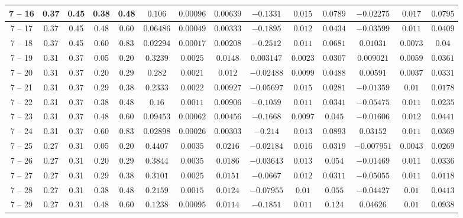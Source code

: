\begin{longtable}{|*{14}{c|}}
\hline
7 -- 16 & 0.37 & 0.45 & 0.38 & 0.48 & $0.106$ & $0.00096$ & $0.00639$ & $-0.1331$ & $0.015$ & $0.0789$ & $-0.02275$ & $0.017$ & $0.0795$ \\
\hline
7 -- 17 & 0.37 & 0.45 & 0.48 & 0.60 & $0.06486$ & $0.00049$ & $0.00333$ & $-0.1895$ & $0.012$ & $0.0434$ & $-0.03599$ & $0.011$ & $0.0409$ \\
\hline
7 -- 18 & 0.37 & 0.45 & 0.60 & 0.83 & $0.02294$ & $0.00017$ & $0.00208$ & $-0.2512$ & $0.011$ & $0.0681$ & $0.01031$ & $0.0073$ & $0.04$ \\
\hline
7 -- 19 & 0.31 & 0.37 & 0.05 & 0.20 & $0.3239$ & $0.0025$ & $0.0148$ & $0.003147$ & $0.0023$ & $0.0307$ & $0.009021$ & $0.0059$ & $0.0361$ \\
\hline
7 -- 20 & 0.31 & 0.37 & 0.20 & 0.29 & $0.282$ & $0.0021$ & $0.012$ & $-0.02488$ & $0.0099$ & $0.0488$ & $0.00591$ & $0.0037$ & $0.0331$ \\
\hline
7 -- 21 & 0.31 & 0.37 & 0.29 & 0.38 & $0.2333$ & $0.0022$ & $0.00927$ & $-0.05697$ & $0.015$ & $0.0281$ & $-0.01359$ & $0.01$ & $0.0178$ \\
\hline
7 -- 22 & 0.31 & 0.37 & 0.38 & 0.48 & $0.16$ & $0.0011$ & $0.00906$ & $-0.1059$ & $0.011$ & $0.0341$ & $-0.05475$ & $0.011$ & $0.0235$ \\
\hline
7 -- 23 & 0.31 & 0.37 & 0.48 & 0.60 & $0.09453$ & $0.00062$ & $0.00456$ & $-0.1668$ & $0.0097$ & $0.045$ & $-0.01606$ & $0.012$ & $0.0441$ \\
\hline
7 -- 24 & 0.31 & 0.37 & 0.60 & 0.83 & $0.02898$ & $0.00026$ & $0.00303$ & $-0.214$ & $0.013$ & $0.0893$ & $0.03152$ & $0.011$ & $0.0369$ \\
\hline
7 -- 25 & 0.27 & 0.31 & 0.05 & 0.20 & $0.4407$ & $0.0035$ & $0.0216$ & $-0.02184$ & $0.016$ & $0.0319$ & $-0.007951$ & $0.0043$ & $0.0269$ \\
\hline
7 -- 26 & 0.27 & 0.31 & 0.20 & 0.29 & $0.3844$ & $0.0035$ & $0.0186$ & $-0.03643$ & $0.013$ & $0.054$ & $-0.01469$ & $0.011$ & $0.0336$ \\
\hline
7 -- 27 & 0.27 & 0.31 & 0.29 & 0.38 & $0.3101$ & $0.0025$ & $0.0151$ & $-0.0667$ & $0.012$ & $0.0311$ & $-0.05055$ & $0.011$ & $0.0118$ \\
\hline
7 -- 28 & 0.27 & 0.31 & 0.38 & 0.48 & $0.2159$ & $0.0015$ & $0.0124$ & $-0.07955$ & $0.01$ & $0.055$ & $-0.04427$ & $0.01$ & $0.0413$ \\
\hline
7 -- 29 & 0.27 & 0.31 & 0.48 & 0.60 & $0.1238$ & $0.00095$ & $0.0114$ & $-0.1851$ & $0.011$ & $0.124$ & $0.04626$ & $0.01$ & $0.0938$ \\

\end{longtable}
